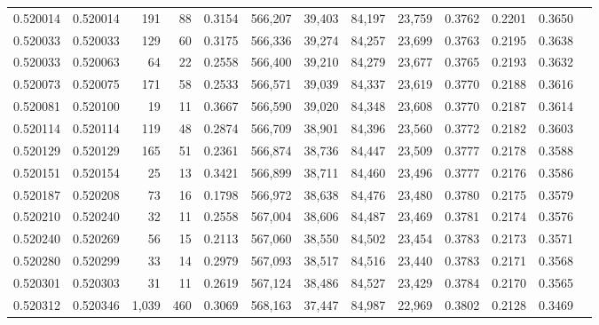 \begin{tabular}{rrrrrrrrrrrrr}
0.520014 & 0.520014 &   191 &    88 &                                     0.3154 & 566,207 &  39,403 &  84,197 &  23,759 & 0.3762 & 0.2201 & 0.3650 \\
0.520033 & 0.520033 &   129 &    60 &                                     0.3175 & 566,336 &  39,274 &  84,257 &  23,699 & 0.3763 & 0.2195 & 0.3638 \\
0.520033 & 0.520063 &    64 &    22 &                                     0.2558 & 566,400 &  39,210 &  84,279 &  23,677 & 0.3765 & 0.2193 & 0.3632 \\
0.520073 & 0.520075 &   171 &    58 &                                     0.2533 & 566,571 &  39,039 &  84,337 &  23,619 & 0.3770 & 0.2188 & 0.3616 \\
0.520081 & 0.520100 &    19 &    11 &                                     0.3667 & 566,590 &  39,020 &  84,348 &  23,608 & 0.3770 & 0.2187 & 0.3614 \\
0.520114 & 0.520114 &   119 &    48 &                                     0.2874 & 566,709 &  38,901 &  84,396 &  23,560 & 0.3772 & 0.2182 & 0.3603 \\
0.520129 & 0.520129 &   165 &    51 &                                     0.2361 & 566,874 &  38,736 &  84,447 &  23,509 & 0.3777 & 0.2178 & 0.3588 \\
0.520151 & 0.520154 &    25 &    13 &                                     0.3421 & 566,899 &  38,711 &  84,460 &  23,496 & 0.3777 & 0.2176 & 0.3586 \\
0.520187 & 0.520208 &    73 &    16 &                                     0.1798 & 566,972 &  38,638 &  84,476 &  23,480 & 0.3780 & 0.2175 & 0.3579 \\
0.520210 & 0.520240 &    32 &    11 &                                     0.2558 & 567,004 &  38,606 &  84,487 &  23,469 & 0.3781 & 0.2174 & 0.3576 \\
0.520240 & 0.520269 &    56 &    15 &                                     0.2113 & 567,060 &  38,550 &  84,502 &  23,454 & 0.3783 & 0.2173 & 0.3571 \\
0.520280 & 0.520299 &    33 &    14 &                                     0.2979 & 567,093 &  38,517 &  84,516 &  23,440 & 0.3783 & 0.2171 & 0.3568 \\
0.520301 & 0.520303 &    31 &    11 &                                     0.2619 & 567,124 &  38,486 &  84,527 &  23,429 & 0.3784 & 0.2170 & 0.3565 \\
0.520312 & 0.520346 & 1,039 &   460 &                                     0.3069 & 568,163 &  37,447 &  84,987 &  22,969 & 0.3802 & 0.2128 & 0.3469 \\

\end{tabular}
